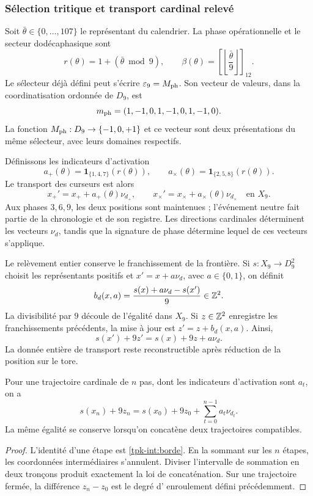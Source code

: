\subsubsection{Sélection tritique et transport cardinal relevé}
\label{tpk-int:seleccion}

Soit \(\bar\theta\in\{0,\ldots,107\}\) le représentant du calendrier.
La phase opérationnelle et le secteur dodécaphasique sont
\begin{equation}
 r(\theta)=1+(\bar\theta\bmod9),\qquad
 \beta(\theta)=\left[\left\lfloor\frac{\bar\theta}{9}\right\rfloor\right]_{12}.
 \label{tpk-int:fase}
\end{equation}
Le sélecteur déjà défini peut s'écrire \(\varepsilon_9=M_{\rm ph}\).
Son vecteur de valeurs, dans la coordinatisation ordonnée de \(D_9\), est
\[
 m_{\rm ph}=(1,-1,0,1,-1,0,1,-1,0).
\]
La fonction \(M_{\rm ph}:D_9\to\{-1,0,+1\}\) et ce vecteur sont deux
présentations du même sélecteur, avec leurs domaines respectifs.

Définissons les indicateurs d'activation
\[
 a_+(\theta)=\mathbf1_{\{1,4,7\}}(r(\theta)),\qquad
 a_\times(\theta)=\mathbf1_{\{2,5,8\}}(r(\theta)).
\]
Le transport des curseurs est alors
\begin{equation}
 x_+'=x_++a_+(\theta)\nu_{d_+},\qquad
 x_\times'=x_\times+a_\times(\theta)\nu_{d_\times}
 \quad\text{en }X_9.
 \label{tpk-int:cursores}
\end{equation}
Aux phases \(3,6,9\), les deux positions sont maintenues ; l'événement neutre
fait partie de la chronologie et de son registre. Les directions cardinales
déterminent les vecteurs \(\nu_d\), tandis que la signature de phase détermine
lequel de ces vecteurs s'applique.

Le relèvement entier conserve le franchissement de la frontière. Si
\(s:X_9\to D_9^2\) choisit les représentants positifs et
\(x'=x+a\nu_d\), avec \(a\in\{0,1\}\), on définit
\begin{equation}
 b_d(x,a)=\frac{s(x)+a\nu_d-s(x')}{9}\in\mathbb Z^2.
 \label{tpk-int:borde}
\end{equation}
La divisibilité par \(9\) découle de l'égalité dans \(X_9\). Si \(z\in\mathbb Z^2\) enregistre les franchissements précédents, la mise à jour est \(z'=z+b_d(x,a)\). Ainsi,
\[
 s(x')+9z'=s(x)+9z+a\nu_d.
\]
La donnée entière de transport reste reconstructible après réduction de
la position sur le tore.

\begin{proposition}
\label{tpk-int:prop-desplazamiento}
Pour une trajectoire cardinale de \(n\) pas, dont les indicateurs d'activation sont \(a_t\), on a
\[
 s(x_n)+9z_n=s(x_0)+9z_0+
 \sum_{t=0}^{n-1}a_t\nu_{d_t}.
\]
La même égalité se conserve lorsqu'on concatène deux trajectoires compatibles.
\end{proposition}
\begin{proof}
L'identité d'une étape est \eqref{tpk-int:borde}. En la sommant sur les
\(n\) étapes, les coordonnées intermédiaires s'annulent. Diviser l'intervalle
de sommation en deux tronçons produit exactement la loi de concaténation. Sur une
trajectoire fermée, la différence \(z_n-z_0\) est le degré d'
enroulement défini précédemment.
\end{proof}

